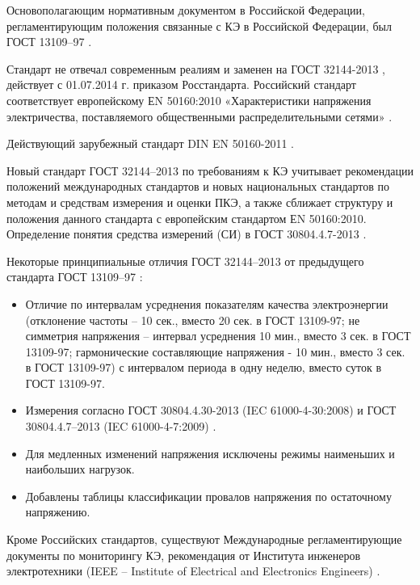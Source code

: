 Основополагающим нормативным документом в Российской Федерации, регламентирующим положения связанные с КЭ в Российской Федерации, был ГОСТ 13109–97 \cite{ГОСТ13109-97}. 

Стандарт не отвечал современным реалиям и заменен на ГОСТ 32144-2013 \cite{ГОСТ32144-2013}, действует с 01.07.2014 г. приказом Росстандарта. Российский стандарт соответствует европейскому ЕN 50160:2010 «Характеристики напряжения электричества, поставляемого общественными распределительными сетями» \cite{ЕN50160:2010}. 

Действующий зарубежный стандарт DIN EN 50160-2011 \cite{DINEN50160-2011}.

Новый стандарт ГОСТ 32144–2013 по требованиям к КЭ учитывает рекомендации положений международных стандартов и новых национальных стандартов по методам и средствам измерения и оценки ПКЭ, а также сближает структуру и положения данного стандарта с европейским стандартом ЕN 50160:2010.
Определение понятия средства измерений (СИ) в ГОСТ 30804.4.7-2013 \cite{ГОСТ30804.4.7-2013}.

Некоторые принципиальные отличия  ГОСТ 32144–2013 \cite{ГОСТ32144-2013} от предыдущего стандарта ГОСТ 13109–97 \cite{ГОСТ13109-97}: 
\begin{itemize}
	\item Отличие по интервалам усреднения показателям качества электроэнергии (отклонение частоты -- 10 сек., вместо 20 сек. в ГОСТ 13109-97; не симметрия напряжения -- интервал усреднения 10 мин., вместо 3 сек. в ГОСТ 13109-97; гармонические составляющие напряжения - 10 мин., вместо 3 сек. в ГОСТ 13109-97) с интервалом периода в одну неделю, вместо суток в ГОСТ 13109-97.
	\item Измерения согласно ГОСТ 30804.4.30-2013 (IEC 61000-4-30:2008) \cite{ГОСТ30804.4.30-2013} и ГОСТ 30804.4.7–2013 (IEC 61000-4-7:2009) \cite{ГОСТ30804.4.7-2013}.
	\item Для медленных изменений напряжения исключены режимы наименьших и наибольших нагрузок.
	\item Добавлены таблицы классификации провалов напряжения по остаточному напряжению.
\end{itemize}

Кроме Российских стандартов, существуют Международные регламентирующие документы по мониторингу КЭ, рекомендация от Института инженеров электротехники (IEEE -- Institute of Electrical and Electronics Engineers) \cite{IEEE_PES}. 

